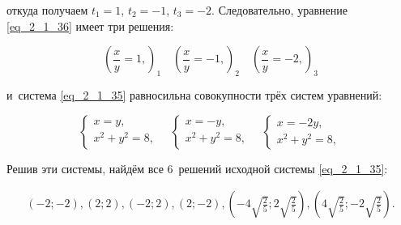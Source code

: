\noindent
откуда получаем $t_{1} = 1$, $t_{2} = -1$, $t_{3} = -2$.
Следовательно, уравнение \eqref{eq_2_1_36} имеет три решения:

\begin{equation}\label{eq_2_1_38}
\left(
\displaystyle \frac{x}{y} = 1,
\right)_{1} \quad
\left(
\displaystyle \frac{x}{y} = -1,
\right)_{2} \quad
\left(
\displaystyle \frac{x}{y} = -2,
\right)_{3}
\end{equation}

\noindent
и~система \eqref{eq_2_1_35} равносильна совокупности трёх систем уравнений:

\begin{equation*}
\begin{cases}
x = y, \\
x^{2} + y^{2} = 8,
\end{cases} \quad
\begin{cases}
x = -y, \\
x^{2} + y^{2} = 8,
\end{cases} \quad
\begin{cases}
x = -2y, \\
x^{2} + y^{2} = 8,
\end{cases}
\end{equation*}

Решив эти системы, найдём все 6~решений исходной системы \eqref{eq_2_1_35}:

\begin{gather*}
(-2; -2), (2; 2), (-2; 2), (2; -2), 
\displaystyle
\left( -4\sqrt{\frac{2}{5}}; 2\sqrt{\frac{2}{5}} \right),
\left( 4\sqrt{\frac{2}{5}}; -2\sqrt{\frac{2}{5}} \right).
\end{gather*}

